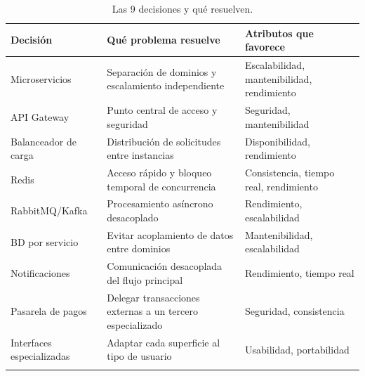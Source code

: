 \documentclass[12pt,a4paper]{article}
\begin{document}
\begin{longtable}{p{3.4cm}p{4.6cm}p{4.6cm}}
\toprule
\textbf{Decisión} & \textbf{Qué problema resuelve} & \textbf{Atributos que favorece}\\
\midrule
Microservicios & Separación de dominios y escalamiento independiente & Escalabilidad,
mantenibilidad, rendimiento\\
API Gateway & Punto central de acceso y seguridad & Seguridad, mantenibilidad\\
Balanceador de carga & Distribución de solicitudes entre instancias & Disponibilidad, rendimiento\\
Redis & Acceso rápido y bloqueo temporal de concurrencia & Consistencia, tiempo real, rendimiento\\
RabbitMQ/Kafka & Procesamiento asíncrono desacoplado & Rendimiento, escalabilidad\\
BD por servicio & Evitar acoplamiento de datos entre dominios & Mantenibilidad, escalabilidad\\
Notificaciones & Comunicación desacoplada del flujo principal & Rendimiento, tiempo real\\
Pasarela de pagos & Delegar transacciones externas a un tercero especializado & Seguridad,
consistencia\\
Interfaces especializadas & Adaptar cada superficie al tipo de usuario & Usabilidad, portabilidad\\
\bottomrule
\caption{Las 9 decisiones y qué resuelven.}
\end{longtable}
\end{document}
